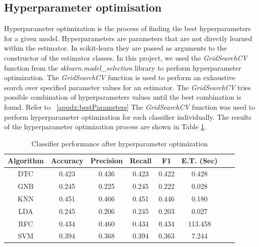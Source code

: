 \documentclass[conference,onecolumn]{IEEEtran}
\begin{document}
    \subsection{Hyperparameter optimisation}
        Hyperparameter optimization is the process of finding the best hyperparameters for a given model. Hyperparameters are parameters that are not directly learned within the estimator. In scikit-learn they are passed as arguments to the constructor of the estimator classes. In this project, we used the \emph{GridSearchCV} function from the \emph{sklearn.model\_selection} library to perform hyperparameter optimization. The \emph{GridSearchCV} function is used to perform an exhaustive search over specified parameter values for an estimator. The \emph{GridSearchCV} tries possible combination of hyperparameters values until the best combination is found. Refer to \appendixname~\ref{appdx:bestParameters} The \emph{GridSearchCV} function was used to perform hyperparameter optimization for each classifier individually. The results of the hyperparameter optimization process are shown in Table \ref{table:hyperparameterOptimizationResults}.

        \begin{table}[H]
            \centering
            \begin{tabular}{|c|c|c|c|c|c|c|c|}
                \hline
                    \textbf{Algorithm} &\textbf{Accuracy} &\textbf{Precision} &\textbf{Recall} &\textbf{F1} &\textbf{E.T. (Sec)} \\ \hline
                    \hline
                    DTC     & 0.423   & 0.436   & 0.423  & 0.422 &  0.428  \\ \hline
                    GNB     & 0.245   & 0.225   & 0.245  & 0.222 &  0.028  \\ \hline
                    KNN     & 0.451   & 0.466   & 0.451  & 0.446 &  0.180  \\ \hline
                    LDA     & 0.245   & 0.206   & 0.245  & 0.203 &  0.027  \\ \hline
                    RFC     & 0.434   & 0.460   & 0.434  & 0.434 & 113.458 \\ \hline
                    SVM     & 0.394   & 0.368   & 0.394  & 0.363 &  7.244  \\
                \hline
            \end{tabular}
            \caption{Classifier performance after hyperparameter optimization}
            \label{table:hyperparameterOptimizationResults}
        \end{table}
\end{document}
